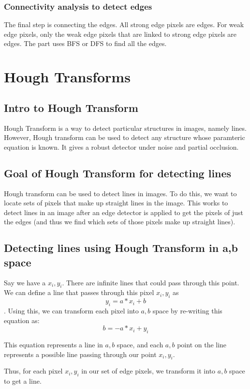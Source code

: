\documentclass{article}
\begin{document}
\subsubsection{Connectivity analysis to detect edges}
The final step is connecting the edges.  All strong edge pixels are edges.  For weak edge pixels, only the weak edge pixels that are linked to strong edge pixels are edges.  The part uses BFS or DFS to find all the edges.

\section{Hough Transforms}
\subsection{Intro to Hough Transform}
Hough Transform is a way to detect particular structures in images, namely lines. However, Hough transform can be used to detect any structure whose paramteric equation is known. It gives a robust detector under noise and partial occlusion.

\subsection{Goal of Hough Transform for detecting lines}
Hough transform can be used to detect lines in images. To do this, we want to locate sets of pixels that make up straight lines in the image. This works to detect lines in an image after an edge detector is applied to get the pixels of just the edges (and thus we find which sets of those pixels make up straight lines).

\subsection{Detecting lines using Hough Transform in a,b space}
Say we have a ${x_i,y_i}$. There are infinite lines that could pass through this point.
We can define a line that passes through this pixel $x_i, y_i$ as $$y_i = a*x_i + b$$. Using this, we can transform each pixel into $a,b$ space by re-writing this equation as:
$$ b = -a*x_i + y_i$$

This equation represents a line in $a,b$ space, and each $a,b$ point on the line represents a possible line passing through our point $x_i,y_i$.

Thus, for each pixel $x_i,y_i$ in our set of edge pixels, we transform it into $a,b$ space to get a line.
\end{document}
